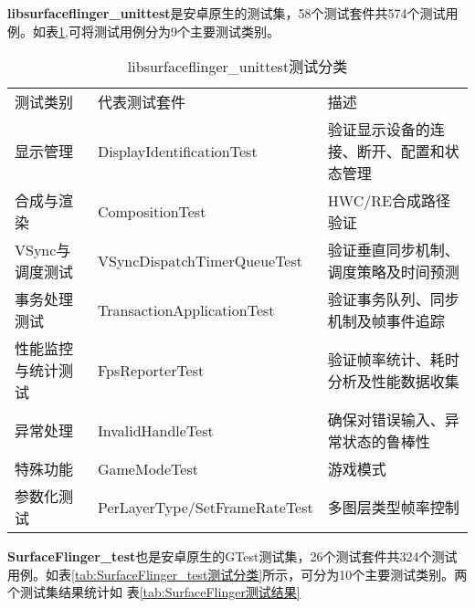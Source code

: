 \textbf{libsurfaceflinger\_unittest}是安卓原生的测试集，58个测试套件共574个测试用例。如表\ref{tab:libsurfaceflinger_unittest测试分类},可将测试用例分为9个主要测试类别。

\begin{table}[H]
    \centering
    \caption{libsurfaceflinger\_unittest测试分类}
    \label{tab:libsurfaceflinger_unittest测试分类}
    \begin{tabular}{lll}
        \toprule
        测试类别 & 代表测试套件	& 描述 \\
        显示管理 & DisplayIdentificationTest & 验证显示设备的连接、断开、配置和状态管理 \\
        合成与渲染 & CompositionTest & HWC/RE合成路径验证 \\
        VSync与调度测试 & VSyncDispatchTimerQueueTest & 验证垂直同步机制、调度策略及时间预测 \\
        事务处理测试 & TransactionApplicationTest & 验证事务队列、同步机制及帧事件追踪 \\
        性能监控与统计测试 & FpsReporterTest & 验证帧率统计、耗时分析及性能数据收集 \\
        异常处理 & InvalidHandleTest & 确保对错误输入、异常状态的鲁棒性 \\
        特殊功能 & GameModeTest & 游戏模式 \\  
        参数化测试 &  PerLayerType/SetFrameRateTest & 多图层类型帧率控制 \\
        \bottomrule
    \end{tabular}
    \note{}
\end{table}

\textbf{SurfaceFlinger\_test}也是安卓原生的GTest测试集，26个测试套件共324个测试用例。如表\ref{tab:SurfaceFlinger_test测试分类}所示，可分为10个主要测试类别。两个测试集结果统计如
表\ref{tab:SurfaceFlinger测试结果}

